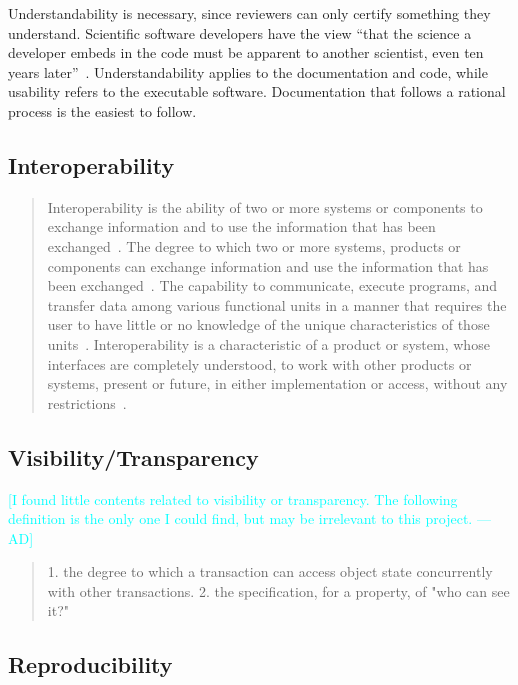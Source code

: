 \documentclass[12pt]{article}
\newcommand{\authornote}[3]{\textcolor{#1}{[#3 ---#2]}}
\newcommand{\authornote}[3]{}
\newcommand{\ad}[1]{\authornote{cyan}{AD}{#1}} %
\begin{document}
Understandability is necessary, since reviewers can only certify something they
understand.  Scientific software developers have the view ``that the science a
developer embeds in the code must be apparent to another scientist, even ten
years later''~\cite{Kelly2013}.  Understandability applies to the documentation
and code, while usability refers to the executable software.  Documentation that
follows a rational process is the easiest to follow.

\subsection{Interoperability}

\begin{quotation}
	\noindent Interoperability is the ability of two or more systems or components to exchange information and to use the information that has been exchanged~\cite{IEEE1991}.
	\noindent The degree to which two or more systems, products or components can exchange information and use the information that has been exchanged~\cite{ISO/IEC25010}.
	\noindent The capability to communicate, execute programs, and transfer data among various functional units in a manner that requires the user to have little or no knowledge of the unique characteristics of those units~\cite{ISO/IEC/IEEE24765}.
	\noindent Interoperability is a characteristic of a product or system, whose interfaces are completely understood, to work with other products or systems, present or future, in either implementation or access, without any restrictions~\cite{AFUL}.
\end{quotation}

\subsection{Visibility/Transparency}
    \ad{I found little contents related to visibility or transparency. The following definition is the only one I could find, but may be irrelevant to this project.}
    \begin{quotation}
        1. the degree to which a transaction can access object state concurrently with other transactions. 2. the specification, for a property, of "who can see it?"~\cite{ISO/IEC/IEEE24765}
    \end{quotation}
\subsection{Reproducibility}
\end{document}
